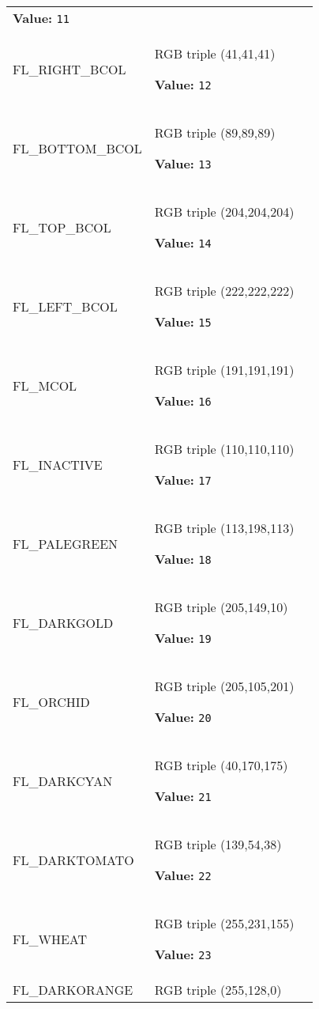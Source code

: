 \begin{longtable}{|p{\varnamewidth}|p{\vardescrwidth}|l}
\textbf{Value:} 
{\tt 11}&\\
\cline{1-2}
\raggedright F\-L\-\_\-R\-I\-G\-H\-T\-\_\-B\-C\-O\-L\- & \raggedright RGB triple (41,41,41)

\textbf{Value:} 
{\tt 12}&\\
\cline{1-2}
\raggedright F\-L\-\_\-B\-O\-T\-T\-O\-M\-\_\-B\-C\-O\-L\- & \raggedright RGB triple (89,89,89)

\textbf{Value:} 
{\tt 13}&\\
\cline{1-2}
\raggedright F\-L\-\_\-T\-O\-P\-\_\-B\-C\-O\-L\- & \raggedright RGB triple (204,204,204)

\textbf{Value:} 
{\tt 14}&\\
\cline{1-2}
\raggedright F\-L\-\_\-L\-E\-F\-T\-\_\-B\-C\-O\-L\- & \raggedright RGB triple (222,222,222)

\textbf{Value:} 
{\tt 15}&\\
\cline{1-2}
\raggedright F\-L\-\_\-M\-C\-O\-L\- & \raggedright RGB triple (191,191,191)

\textbf{Value:} 
{\tt 16}&\\
\cline{1-2}
\raggedright F\-L\-\_\-I\-N\-A\-C\-T\-I\-V\-E\- & \raggedright RGB triple (110,110,110)

\textbf{Value:} 
{\tt 17}&\\
\cline{1-2}
\raggedright F\-L\-\_\-P\-A\-L\-E\-G\-R\-E\-E\-N\- & \raggedright RGB triple (113,198,113)

\textbf{Value:} 
{\tt 18}&\\
\cline{1-2}
\raggedright F\-L\-\_\-D\-A\-R\-K\-G\-O\-L\-D\- & \raggedright RGB triple (205,149,10)

\textbf{Value:} 
{\tt 19}&\\
\cline{1-2}
\raggedright F\-L\-\_\-O\-R\-C\-H\-I\-D\- & \raggedright RGB triple (205,105,201)

\textbf{Value:} 
{\tt 20}&\\
\cline{1-2}
\raggedright F\-L\-\_\-D\-A\-R\-K\-C\-Y\-A\-N\- & \raggedright RGB triple (40,170,175)

\textbf{Value:} 
{\tt 21}&\\
\cline{1-2}
\raggedright F\-L\-\_\-D\-A\-R\-K\-T\-O\-M\-A\-T\-O\- & \raggedright RGB triple (139,54,38)

\textbf{Value:} 
{\tt 22}&\\
\cline{1-2}
\raggedright F\-L\-\_\-W\-H\-E\-A\-T\- & \raggedright RGB triple (255,231,155)

\textbf{Value:} 
{\tt 23}&\\
\cline{1-2}
\raggedright F\-L\-\_\-D\-A\-R\-K\-O\-R\-A\-N\-G\-E\- & \raggedright RGB triple (255,128,0)


\end{longtable}
